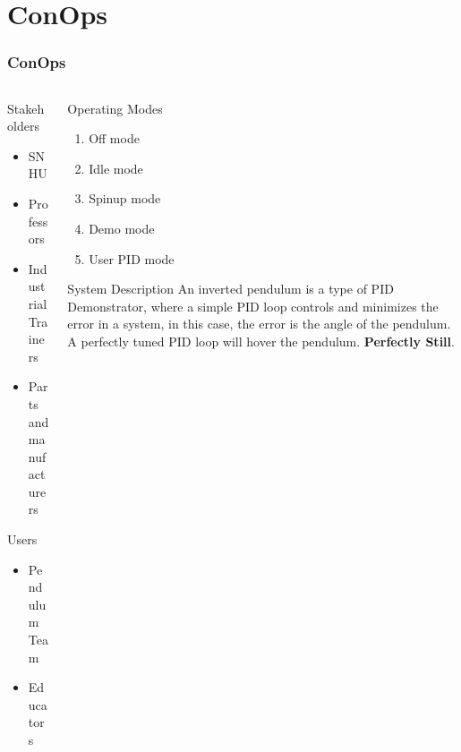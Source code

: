 \documentclass[aspectratio=169]{beamer}
\begin{document}
\section{ConOps}
\begin{frame}
    \frametitle{ConOps}

    \begin{columns}

    \begin{column}{0.34\textwidth}
        Stakeholders
        \begin{itemize}
         \item SNHU
         \item Professors
         \item Industrial Trainers
         \item Parts and manufacturers
        \end{itemize}

        Users
        \begin{itemize}
         \item Pendulum Team
         \item Educators
        \end{itemize}
    \end{column}

    \begin{column}{0.65\textwidth}
        \begin{block}{Operating Modes}
            \begin{enumerate}
            \item Off mode
            \item Idle mode
            \item Spinup mode
            \item Demo mode
            \item User PID mode
            \end{enumerate}
        \end{block}

        \begin{block}{System Description}
            \small{An inverted pendulum is a type of PID Demonstrator, where a simple PID loop
            controls and minimizes the error in a system, in this case, the error is the angle of the pendulum. A perfectly tuned PID loop will hover the pendulum.}
            \textbf{Perfectly Still}.
        \end{block}
    \end{column}
\end{columns}


\end{frame}
\end{document}
